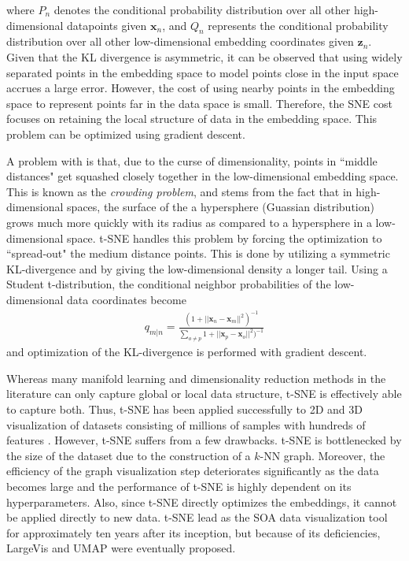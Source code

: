 \noindent
where $P_{n}$ denotes the conditional probability distribution over all other high-dimensional datapoints given $\bm{x}_{n}$, and $Q_{n}$ represents the conditional probability distribution over all other low-dimensional embedding coordinates given $\bm{z}_{n}$.  Given that the KL divergence is asymmetric, it can be observed that using widely separated points in the embedding space to model points close in the input space accrues a large error.  However, the cost of using nearby points in the embedding space to represent points far in the data space is small.  Therefore, the SNE cost focuses on retaining the local structure of data in the embedding space.  This problem can be optimized using gradient descent.  

A problem with is that, due to the curse of dimensionality, points in ``middle distances" get squashed closely together in the low-dimensional embedding space.  This is known as the \textit{crowding problem}, and stems from the fact that in high-dimensional spaces, the surface of the a hypersphere (Guassian distribution) grows much more quickly with its radius as compared to a hypersphere in a low-dimensional space.  t-SNE handles this problem by forcing the optimization to ``spread-out" the medium distance points.  This is done by utilizing a symmetric KL-divergence and by giving the low-dimensional density a longer tail.  Using a Student t-distribution, the conditional neighbor probabilities of the low-dimensional data coordinates become
\begin{align} \label{eq:tSNE_low_dim_similarity}
	q_{m|n} = \frac{(1 + ||\bm{x}_{n} - \bm{x}_{m}  ||^{2})^{-1}}{\sum_{o \neq p}1 + ||\bm{x}_{p} - \bm{x}_{o}  ||^{2})^{-1}}
\end{align}
\noindent
and optimization of the KL-divergence is performed with gradient descent.

Whereas many manifold learning and dimensionality reduction methods in the literature can only capture global or local data structure, t-SNE is effectively able to capture both.  Thus, t-SNE has been applied successfully to 2D and 3D visualization of datasets consisting of millions of samples with hundreds of features \citep{Tang2016LargeVis, McInnes2018UMAP}.  However, t-SNE suffers from a few drawbacks. t-SNE is bottlenecked by the size of the dataset due to the construction of a $k$-NN graph.  Moreover, the efficiency of the graph visualization step deteriorates significantly as the data becomes large and the performance of t-SNE is highly dependent on its hyperparameters.  Also, since t-SNE directly optimizes the embeddings, it cannot be applied directly to new data.  t-SNE lead as the SOA data visualization tool for approximately ten years after its inception, but because of its deficiencies, LargeVis \citep{Tang2016LargeVis} and UMAP \citep{McInnes2018UMAP} were eventually proposed. 

